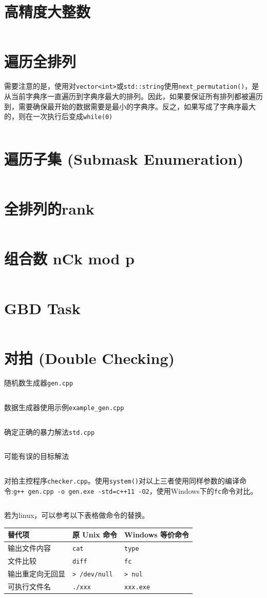 \documentclass[openany,a4paper]{book}
\begin{document}
\section{高精度大整数}
\inputminted{cpp}{Misc/BigInt.h}

\section{遍历全排列}
需要注意的是，使用对\verb|vector<int>|或\verb|std::string|使用\verb|next_permutation()|，是从当前字典序一直遍历到字典序最大的排列。因此，如果要保证所有排列都被遍历到，需要确保最开始的数据需要是最小的字典序。反之，如果写成了字典序最大的，则在一次执行后变成\verb|while(0)|
\inputminted{cpp}{Misc/next_permutation.h}

\section{遍历子集 (Submask Enumeration)}
\inputminted{cpp}{Misc/next_submask.hpp}

\section{全排列的rank}
\inputminted{cpp}{Misc/permutation.h}

\section{组合数 nCk mod p}
\inputminted{cpp}{Misc/lucas.h}

\section{GBD Task}
\inputminted{json}{Misc/GDB-Task.json}

\section{对拍 (Double Checking)}
随机数生成器\verb|gen.cpp|
\inputminted{cpp}{Misc/DoubleChecking/gen.cpp}
数据生成器使用示例\verb|example_gen.cpp|
\inputminted{cpp}{Misc/DoubleChecking/example_gen.cpp}
确定正确的暴力解法\verb|std.cpp|
\inputminted{cpp}{Misc/DoubleChecking/std.cpp}
可能有误的目标解法
\inputminted{cpp}{Misc/DoubleChecking/sol.cpp}
对拍主控程序\verb|checker.cpp|。使用\verb|system()|对以上三者使用同样参数的编译命令:\newline\verb|g++ gen.cpp -o gen.exe -std=c++11 -O2|，使用Windows下的\verb|fc|命令对比。
\inputminted{cpp}{Misc/DoubleChecking/checker.cpp}
若为linux，可以参考以下表格做命令的替换。\newline
\begin{tabular}{|l|l|l|}
    \hline
    替代项      & 原 Unix 命令            & Windows 等价命令     \\
    \hline
    输出文件内容   & \texttt{cat}         & \texttt{type}    \\
    文件比较     & \texttt{diff}        & \texttt{fc}      \\
    输出重定向无回显 & \texttt{> /dev/null} & \texttt{> nul}   \\
    可执行文件名   & \texttt{./xxx}       & \texttt{xxx.exe} \\
    \hline
\end{tabular}
\end{document}
